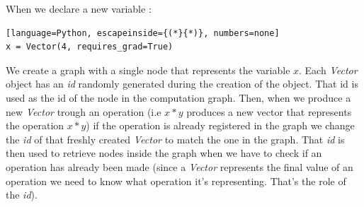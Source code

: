 \documentclass[12pt]{article}
\begin{document}
When we declare a new variable :

\begin{lstlisting}[language=Python, escapeinside={(*}{*)}, numbers=none]
x = Vector(4, requires_grad=True)
\end{lstlisting}

We create a graph with a single node that represents the variable $x$. Each {\it Vector}  object has an {\it id} randomly generated during the creation of the object. That id is used as the id of the node in the computation graph. Then, when we produce a new {\it Vector} trough an operation (i.e $x*y$ produces a new vector that represents the operation $x*y$) if the operation is already registered in the graph we change the {\it id} of that freshly created {\it Vector} to match the one in the graph. That {\it id} is then used to retrieve nodes inside the graph when we have to check if an operation has already been made (since a {\it Vector} represents the final value of an operation we need to know what operation it's representing. That's the role of the {\it id}).


\newpage


\end{document}
